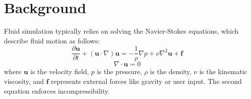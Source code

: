\section{Background}
Fluid simulation typically relies on solving the Navier-Stokes equations, which describe fluid motion as follows:
\begin{equation}
\frac{\partial \mathbf{u}}{\partial t} + (\mathbf{u}\cdot\nabla)\mathbf{u} = -\frac{1}{\rho}\nabla p + \nu\nabla^2\mathbf{u} + \mathbf{f}
\end{equation}
\begin{equation}
\nabla \cdot \mathbf{u} = 0
\end{equation}
where $\mathbf{u}$ is the velocity field, $p$ is the pressure, $\rho$ is the density, $\nu$ is the kinematic viscosity, and $\mathbf{f}$ represents external forces like gravity or user input. The second equation enforces incompressibility.

